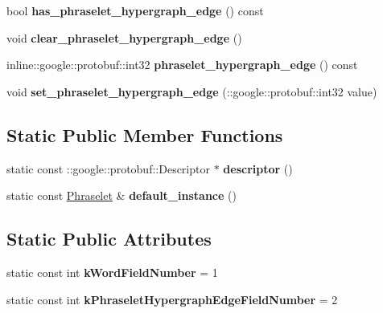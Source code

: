 \begin{DoxyCompactItemize}
\item 
\hypertarget{classlattice_1_1Phraselet_a9a6afc2d0f7466317b7bbd0ebe8eb5d4}{
bool {\bfseries has\_\-phraselet\_\-hypergraph\_\-edge} () const }
\label{classlattice_1_1Phraselet_a9a6afc2d0f7466317b7bbd0ebe8eb5d4}

\item 
\hypertarget{classlattice_1_1Phraselet_a4c9f2577858563c51a8531604e30b1a7}{
void {\bfseries clear\_\-phraselet\_\-hypergraph\_\-edge} ()}
\label{classlattice_1_1Phraselet_a4c9f2577858563c51a8531604e30b1a7}

\item 
\hypertarget{classlattice_1_1Phraselet_a36ecf9680559a4cfdb011c8531830220}{
inline::google::protobuf::int32 {\bfseries phraselet\_\-hypergraph\_\-edge} () const }
\label{classlattice_1_1Phraselet_a36ecf9680559a4cfdb011c8531830220}

\item 
\hypertarget{classlattice_1_1Phraselet_ae9112854c9a8406aeef40c13f9c8b02a}{
void {\bfseries set\_\-phraselet\_\-hypergraph\_\-edge} (::google::protobuf::int32 value)}
\label{classlattice_1_1Phraselet_ae9112854c9a8406aeef40c13f9c8b02a}

\end{DoxyCompactItemize}
\subsection*{Static Public Member Functions}
\begin{DoxyCompactItemize}
\item 
\hypertarget{classlattice_1_1Phraselet_a193ff7d5abcd214ec1adb738bff0c420}{
static const ::google::protobuf::Descriptor $\ast$ {\bfseries descriptor} ()}
\label{classlattice_1_1Phraselet_a193ff7d5abcd214ec1adb738bff0c420}

\item 
\hypertarget{classlattice_1_1Phraselet_a52928d0b7933f4bd9eb807da16b82fe0}{
static const \hyperlink{classlattice_1_1Phraselet}{Phraselet} \& {\bfseries default\_\-instance} ()}
\label{classlattice_1_1Phraselet_a52928d0b7933f4bd9eb807da16b82fe0}

\end{DoxyCompactItemize}
\subsection*{Static Public Attributes}
\begin{DoxyCompactItemize}
\item 
\hypertarget{classlattice_1_1Phraselet_abc30d76e181d14e5a53cee96bdd50eda}{
static const int {\bfseries kWordFieldNumber} = 1}
\label{classlattice_1_1Phraselet_abc30d76e181d14e5a53cee96bdd50eda}

\item 
\hypertarget{classlattice_1_1Phraselet_a99ae4ed782afdeef679118bef7361c00}{
static const int {\bfseries kPhraseletHypergraphEdgeFieldNumber} = 2}
\label{classlattice_1_1Phraselet_a99ae4ed782afdeef679118bef7361c00}

\end{DoxyCompactItemize}
